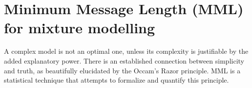 \documentclass{elsarticle}
\begin{document}


\section{Minimum Message Length (MML) for mixture modelling}
A complex model is not an optimal one, unless its complexity is justifiable by 
the added explanatory power. There is an established connection between 
simplicity and truth, as beautifully elucidated by the Occam's Razor principle. 
MML is a statistical technique that attempts to formalize and quantify this principle.




\end{document}
